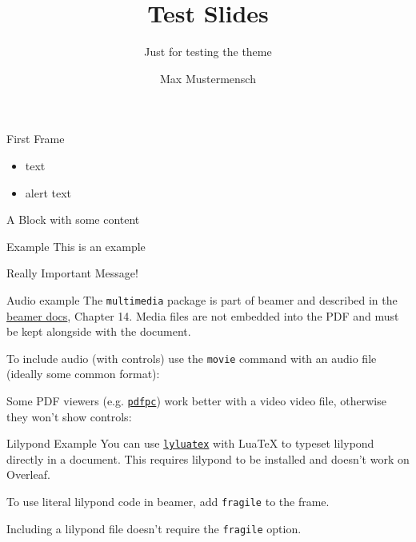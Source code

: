 \documentclass[aspectratio=169]{beamer}
\title{Test Slides}
\subtitle{Just for testing the theme}
\author{Max Mustermensch}
\begin{document}
\maketitle

\begin{frame}{First Frame}
  \begin{itemize}
  \item text
  \item \alert{alert text}
  \end{itemize}
  \begin{block}{A Block}
    with some content
  \end{block}
  \begin{exampleblock}{Example}
    This is an example
  \end{exampleblock}
\end{frame}

\begin{frame}[standout]
  Really Important Message!
\end{frame}

\begin{frame}{Audio example}
  The \texttt{multimedia} package is part of beamer and described in the \href{https://ctan.org/pkg/beamer}{\alert{beamer docs}}, Chapter 14.
  Media files are \alert{not} embedded into the PDF and must be kept alongside with the document.

  To include audio (with controls) use the \texttt{movie} command with an audio file (ideally some common format):\\

  Some PDF viewers (e.g. \href{https://pdfpc.github.io/}{\texttt{pdfpc}}) work better with a video video file,
  otherwise they won't show controls:\\
\end{frame}

\begin{frame}[fragile]{Lilypond Example}
  You can use \href{https://github.com/jperon/lyluatex}{\texttt{lyluatex}} with LuaTeX
  to typeset lilypond directly in a document.
  This requires lilypond to be installed and doesn't work on Overleaf.

  To use literal lilypond code in beamer, add \texttt{fragile} to the frame.


  Including a lilypond file doesn't require the \texttt{fragile} option.

\end{frame}
\end{document}

